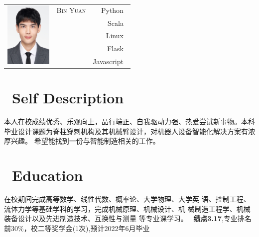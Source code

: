 \documentclass{resume}
\begin{document}

\Large{
  \begin{tabu}{ c l r }
    & \scshape{Bin Yuan} & {Python~} \\
    &  & {Scala~} \\
    &  & {Linux~} \\
    &  & {Flask~} \\
    &  & {Javascript~}
  \end{tabu}
}

\section{\faThumbsUp \ Self Description}
本人在校成绩优秀、乐观向上，品行端正、自我驱动力强、热爱尝试新事物。本科毕业设计课题为脊柱穿刺机构及其机械臂设计，对机器人设备智能化解决方案有浓厚兴趣。
希望能找到一份与智能制造相关的工作。
\section{\faGraduationCap\  Education}

在校期间完成高等数学、线性代数、概率论、大学物理、大学英 语、控制工程、流体力学等基础学科的学习，完成机械原理、机械设计、机 械制造工程学、机械装备设计以及先进制造技术、互换性与测量 等专业课学习。
\ \textbf{绩点3.17},专业排名前30\%，校二等奖学金(1次),预计2022年6月毕业
\end{document}
